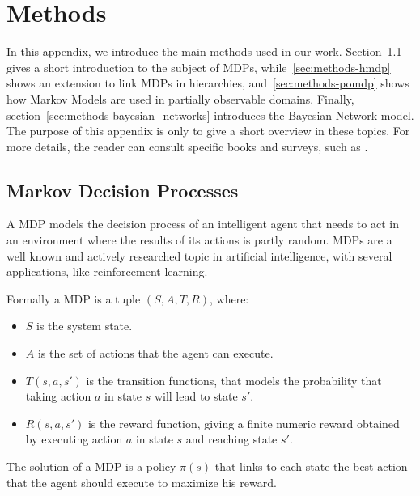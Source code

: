 
\chapter{Methods} %

\label{appendix-methods} %


In this appendix, we introduce the main methods used in our work. Section~\ref{sec:methods-mdp} gives a short introduction to the subject of MDPs, while~\ref{sec:methods-hmdp} shows an extension to link MDPs in hierarchies, and~\ref{sec:methods-pomdp} shows how Markov Models are used in partially observable domains. Finally, section~\ref{sec:methods-bayesian_networks} introduces the Bayesian Network model. The purpose of this appendix is only to give a short overview in these topics. For more details, the reader can consult specific books and surveys, such as \cite{2012Mausam}.
  
\section{Markov Decision Processes}
\label{sec:methods-mdp}
A MDP models the decision process of an intelligent agent that needs to act in an environment where the results of its actions is partly random. MDPs are a well known and actively researched topic in artificial intelligence, with several applications, like reinforcement learning.

Formally a MDP is a tuple $(S,A,T,R)$, where: 
\begin{itemize}
\item $S$ is the system state.
\item $A$ is the set of actions that the agent can execute.
\item $T(s,a,s')$ is the transition functions, that models the probability that taking action $a$ in state $s$ will lead to state $s'$.
\item $R(s,a,s')$ is the reward function, giving a finite numeric reward obtained by executing action $a$ in state $s$ and reaching state $s'$.
\end{itemize}

The solution of a MDP is a policy $\pi(s)$ that links to each state the best action that the agent should execute to maximize his reward.

